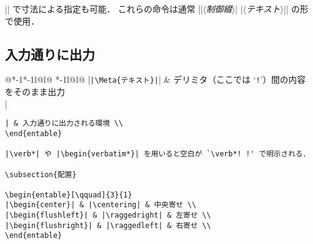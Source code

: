 \documentclass[10pt,a4paper,landscape,draft]{jarticle}
\makeatletter
\def\set@etsep#1#2{\def\etcolsep{#1}\def\etitemsep{#2}}
\newenvironment{entable}[3][\quad\qquad]{%
  \set@etsep#1\relax\relax
  \begin{tabular}{%
    @{}*{\the\numexpr#3-1}{*{\the\numexpr#2-1}{l@{\etcolsep}}l@{\etitemsep}}%
    *{\the\numexpr#2-1}{l@{\etcolsep}}l@{}}}{%
  \end{tabular}}
\newcommand{\Meta}[1]{$\langle$\mbox{}\emph{#1}\mbox{}$\rangle$}
\makeatother
\begin{document}
\egroup

|\fontsize{|\Meta{サイズ}|}{|\Meta{行送り}|}\selectfont| で寸法による指定も可能．
これらの命令は通常 |{|\Meta{制御綴}| |\Meta{テキスト}|}| の形で使用．

\subsection{入力通りに出力}

\begin{entable}[\enspace]{2}{1}
|\verb!|\Meta{テキスト}|!| & デリミタ（ここでは `\texttt{!}'）間の内容をそのまま出力 \\
|\begin{verbatim}| & 入力通りに出力される環境 \\
\end{entable}

|\verb*| や |\begin{verbatim*}| を用いると空白が `\verb*! !' で明示される．

\subsection{配置}

\begin{entable}[\qquad]{3}{1}
|\begin{center}| & |\centering| & 中央寄せ \\
|\begin{flushleft}| & |\raggedright| & 左寄せ \\
|\begin{flushright}| & |\raggedleft| & 右寄せ \\
\end{entable}


\end{verbatim}
\end{entable}
\end{document}
\end{multicols}
\end{document}
